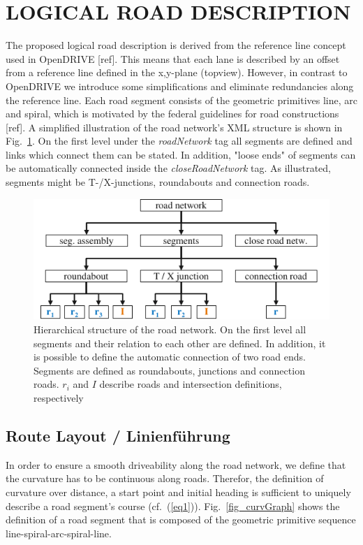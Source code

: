 \documentclass[a4paper, 10pt, conference]{ieeeconf}      %
\begin{document}
\section{LOGICAL ROAD DESCRIPTION}
The proposed logical road description is derived from the reference line concept used in OpenDRIVE [ref]. This means that each lane is described by an offset from a reference line defined in the x,y-plane (topview). However, in contrast to OpenDRIVE we introduce some simplifications and eliminate redundancies along the reference line. Each road segment consists of the geometric primitives line, arc and spiral, which is motivated by the federal guidelines for road constructions [ref]. A simplified illustration of the road network's XML structure is shown in Fig.~\ref{fig_schema}. On the first level under the \textit{roadNetwork} tag all segments are defined and links which connect them can be stated. In addition, "loose ends" of segments can be automatically connected inside the \textit{closeRoadNetwork} tag. As illustrated, segments might be T-/X-junctions, roundabouts and connection roads. 
\begin{figure}[thpb] 		
	\centering
	\includegraphics{fig/schema.pdf}
	\caption{Hierarchical structure of the road network. On the first level all segments and their relation to each other are defined. In addition, it is possible to define the automatic connection of two road ends. Segments are defined as roundabouts, junctions and connection roads. $r_i$ and $I$ describe roads and intersection definitions, respectively}
	\label{fig_schema}
\end{figure}
\subsection{Route Layout / Linienführung} %
In order to ensure a smooth driveability along the road network, we define that the curvature has to be continuous along roads. Therefor, the definition of curvature over distance, a start point and initial heading is sufficient to uniquely describe a road segment's course (cf.~(\ref{eq1})). Fig.~\ref{fig_curvGraph} shows the definition of a road segment that is composed of the geometric primitive sequence line-spiral-arc-spiral-line.
\end{document}
